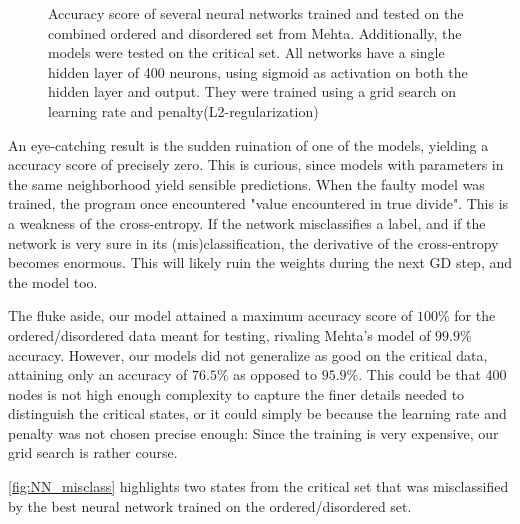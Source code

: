 \begin{figure}[H]
\caption{Accuracy score of several neural networks trained and tested on the combined ordered and disordered set from Mehta. Additionally, the models were tested on the critical set. All networks have a single hidden layer of 400 neurons, using sigmoid as activation on both the hidden layer and output. They were trained using a grid search on learning rate and penalty(L2-regularization)}
\label{fig:NN_class}
\end{figure}

An eye-catching result is the sudden ruination of one of the models, yielding a accuracy score of precisely zero. This is curious, since models with parameters in the same neighborhood yield sensible predictions. When the faulty model was trained, the program once encountered "value encountered in true divide". This is a weakness of the cross-entropy. If the network misclassifies a label, and if the network is very sure in its (mis)classification, the derivative of the cross-entropy becomes enormous. This will likely ruin the weights during the next GD step, and the model too.

The fluke aside, our model attained a maximum accuracy score of $100\%$ for the ordered/disordered data meant for testing, rivaling Mehta's model of $99.9\%$ accuracy. However, our models did not generalize as good on the critical data, attaining only an accuracy of $76.5\%$ as opposed to $95.9\%$. This could be that 400 nodes is not high enough complexity to capture the finer details needed to distinguish the critical states, or it could simply be because the learning rate and penalty was not chosen precise enough: Since the training is very expensive, our grid search is rather course.

\autoref{fig:NN_misclass} highlights two states from the critical set that was misclassified by the best neural network trained on the ordered/disordered set.

